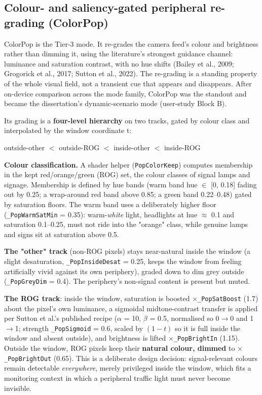 \subsection{Colour- and saliency-gated peripheral re-grading (ColorPop)}

ColorPop is the Tier-3 mode. It re-grades the camera feed's colour and brightness rather than
dimming it, using the literature's strongest guidance channel: luminance and saturation contrast,
with no hue shifts (Bailey et al., 2009; Grogorick et al., 2017; Sutton et al., 2022). The re-grading
is a standing property of the whole visual field, not a transient cue that appears and disappears.
After on-device comparison across the mode family, ColorPop was the standout and became the
dissertation's dynamic-scenario mode (user-study Block B).

Its grading is a \textbf{four-level hierarchy} on two tracks, gated by colour class and interpolated by
the window coordinate t:

\begin{center}
outside-other $<$ outside-ROG $<$ inside-other $<$ inside-ROG
\end{center}

\textbf{Colour classification.} A shader helper (\verb|PopColorKeep|) computes membership in the kept
red/orange/green (ROG) set, the colour classes of signal lamps and signage. Membership is defined
by hue bands (warm band hue $\in$ [0, 0.18] fading out by 0.25; a wrap-around red band above 0.85; a
green band 0.22–0.48) gated by saturation floors. The warm band uses a deliberately higher floor
(\verb|_PopWarmSatMin| = 0.35): warm-\textit{white} light, headlights at hue $\approx$ 0.1 and saturation 0.1–0.25,
must not ride into the "orange" class, while genuine lamps and signs sit at saturation above 0.5.

\textbf{The "other" track} (non-ROG pixels) stays near-natural inside the window (a slight desaturation,
\verb|_PopInsideDesat| = 0.25, keeps the window from feeling artificially vivid against its own
periphery), graded down to dim grey outside (\verb|_PopGreyDim| = 0.4). The periphery's non-signal
content is present but muted.

\textbf{The ROG track}: inside the window, saturation is boosted $\times$\verb|_PopSatBoost| (1.7) about the pixel's
own luminance, a sigmoidal midtone-contrast transfer is applied per Sutton et al.'s published recipe
($\alpha$ = 10, $\beta$ = 0.5, normalised so 0$\rightarrow$0 and 1$\rightarrow$1; strength \verb|_PopSigmoid| = 0.6, scaled by $(1-t)$ so it is
full inside the window and absent outside), and brightness is lifted $\times$\verb|_PopBrightIn| (1.15).
Outside the window, ROG pixels keep their \textbf{natural colour, dimmed} to $\times$\verb|_PopBrightOut| (0.65).
This is a deliberate design decision: signal-relevant colours remain detectable \textit{everywhere}, merely
privileged inside the window, which fits a monitoring context in which a peripheral traffic light
must never become invisible.

